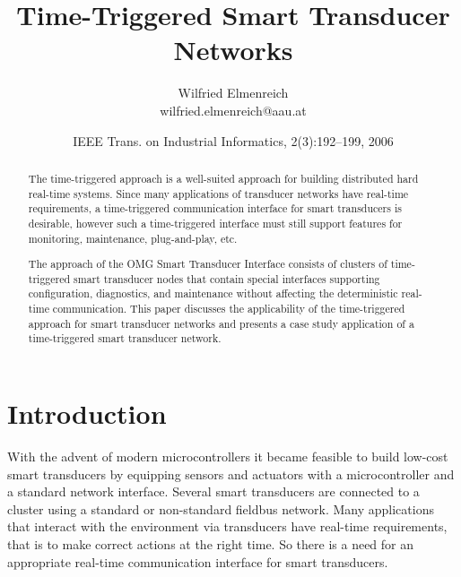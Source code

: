 \documentclass[11pt,a4paper,]{article}
\begin{document}
\lstset{extendedchars=true,
        basicstyle=\footnotesize\ttfamily,
lineskip=2pt,
}



\title{Time-Triggered Smart Transducer Networks}

\author{Wilfried Elmenreich\\
    wilfried.elmenreich@aau.at}

\date{IEEE Trans. on Industrial Informatics, 2(3):192–199, 2006}

\maketitle

\begin{abstract}
The time-triggered approach is a well-suited approach for building
distributed hard real-time systems. Since many applications of
transducer networks have real-time requirements, a time-triggered
communication interface for smart transducers is desirable,
however such a time-triggered interface must still support
features for monitoring, maintenance, plug-and-play, etc.

The approach of the \ac{OMG} Smart Transducer Interface consists of
clusters of time-triggered smart transducer nodes that contain
special interfaces supporting configuration, diagnostics, and
maintenance without affecting the deterministic real-time
communication. This paper discusses the applicability of the
time-triggered approach for smart transducer networks and presents a
case study application of a time-triggered smart transducer network.
\end{abstract}


\section{Introduction} \label{sec:introduction}

With the advent of modern microcontrollers it became feasible to
build low-cost smart transducers by equipping sensors and
actuators with a microcontroller and a standard network interface.
Several smart transducers are connected to a cluster using a
standard or non-standard fieldbus network. Many applications that
interact with the environment via transducers have real-time
requirements, that is to make correct actions at the right time.
So there is a need for an appropriate real-time communication
interface for smart transducers.
\end{document}
